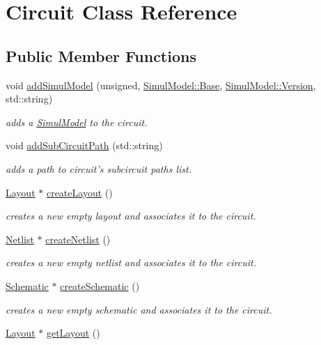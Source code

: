 \hypertarget{class_open_chams_1_1_circuit}{\section{Circuit Class Reference}
\label{class_open_chams_1_1_circuit}
}
\subsection*{Public Member Functions}
\begin{DoxyCompactItemize}
\item 
void \hyperlink{class_open_chams_1_1_circuit_a7c1c09f44cf215dc17d3dd2518e32389}{add\-Simul\-Model} (unsigned, \hyperlink{class_open_chams_1_1_simul_model_a450696a95d6cb29d7723838846948340}{Simul\-Model\-::\-Base}, \hyperlink{class_open_chams_1_1_simul_model_a2256f5bba1c1c69a92b933aa501df470}{Simul\-Model\-::\-Version}, std\-::string)
\begin{DoxyCompactList}\small\item\em adds a \hyperlink{class_open_chams_1_1_simul_model}{Simul\-Model} to the circuit. \end{DoxyCompactList}\item 
void \hyperlink{class_open_chams_1_1_circuit_a55234deef1d06c617a519a575ce33608}{add\-Sub\-Circuit\-Path} (std\-::string)
\begin{DoxyCompactList}\small\item\em adds a path to circuit's subcircuit paths list. \end{DoxyCompactList}\item 
\hyperlink{class_open_chams_1_1_layout}{Layout} $\ast$ \hyperlink{class_open_chams_1_1_circuit_a725a691b0117c4b913b54e7bfd92832f}{create\-Layout} ()
\begin{DoxyCompactList}\small\item\em creates a new empty layout and associates it to the circuit. \end{DoxyCompactList}\item 
\hyperlink{class_open_chams_1_1_netlist}{Netlist} $\ast$ \hyperlink{class_open_chams_1_1_circuit_a3f11671c7ea7b4e2cc3487bd7954b667}{create\-Netlist} ()
\begin{DoxyCompactList}\small\item\em creates a new empty netlist and associates it to the circuit. \end{DoxyCompactList}\item 
\hyperlink{class_open_chams_1_1_schematic}{Schematic} $\ast$ \hyperlink{class_open_chams_1_1_circuit_a57a79a9916df4512648bb195decb7250}{create\-Schematic} ()
\begin{DoxyCompactList}\small\item\em creates a new empty schematic and associates it to the circuit. \end{DoxyCompactList}\item 
\hypertarget{class_open_chams_1_1_circuit_a403a908943f9a3e820fd25a86d00531d}{\hyperlink{class_open_chams_1_1_layout}{Layout} $\ast$ \hyperlink{class_open_chams_1_1_circuit_a403a908943f9a3e820fd25a86d00531d}{get\-Layout} ()}\label{class_open_chams_1_1_circuit_a403a908943f9a3e820fd25a86d00531d}


\end{DoxyCompactItemize}
